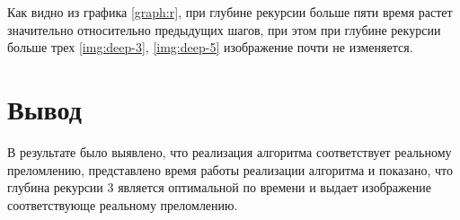 \newpage

Как видно из графика \ref{graph:r}, при глубине рекурсии больше пяти время растет значительно относительно предыдущих шагов, при этом при глубине рекурсии больше трех \ref{img:deep-3}, \ref{img:deep-5} изображение почти не изменяется. 

\section*{Вывод}

В результате было выявлено, что реализация алгоритма соответствует реальному преломлению, представлено время работы реализации алгоритма и показано, что глубина рекурсии 3 является оптимальной по времени и выдает изображение соответствующе реальному преломлению.